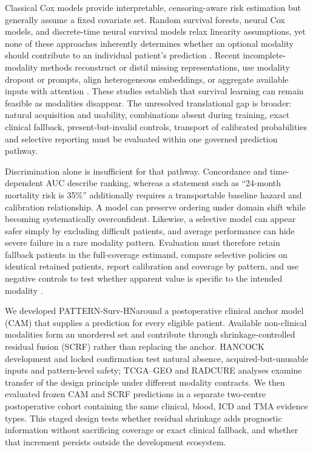 \documentclass[pdflatex,sn-nature]{sn-jnl}
\newcommand{\methodname}{PATTERN-Surv-HN}
\newcommand{\anchorname}{clinical anchor model (CAM)}
\newcommand{\fusionname}{shrinkage-controlled residual fusion (SCRF)}
\begin{document}
Classical Cox models provide interpretable, censoring-aware risk estimation but generally assume a fixed covariate set\cite{cox1972,breslow1974,harrell1996}. Random survival forests, neural Cox models, and discrete-time neural survival models relax linearity assumptions, yet none of these approaches inherently determines whether an optional modality should contribute to an individual patient's prediction \cite{ishwaran2008,katzman2018,lee2018,gensheimer2019,kvamme2019}. Recent incomplete-modality methods reconstruct or distil missing representations, use modality dropout or prompts, align heterogeneous embeddings, or aggregate available inputs with attention \cite{xu2025,zheng2026,ruffini2026}. These studies establish that survival learning can remain feasible as modalities disappear. The unresolved translational gap is broader: natural acquisition and usability, combinations absent during training, exact clinical fallback, present-but-invalid controls, transport of calibrated probabilities and selective reporting must be evaluated within one governed prediction pathway.

Discrimination alone is insufficient for that pathway. Concordance and time-dependent AUC describe ranking, whereas a statement such as ``24-month mortality risk is 35\%'' additionally requires a transportable baseline hazard and calibration relationship. A model can preserve ordering under domain shift while becoming systematically overconfident. Likewise, a selective model can appear safer simply by excluding difficult patients, and average performance can hide severe failure in a rare modality pattern. Evaluation must therefore retain fallback patients in the full-coverage estimand, compare selective policies on identical retained patients, report calibration and coverage by pattern, and use negative controls to test whether apparent value is specific to the intended modality \cite{graf1999,gerds2006,heagerty2000,uno2011,stegyerberg2010,pencina2008,vancalster2019,vickers2006,guo2017,niculescu2005,geirhos2020,ongly2024}.

We developed \methodname around a postoperative \anchorname{} that supplies a prediction for every eligible patient. Available non-clinical modalities form an unordered set and contribute through \fusionname{} rather than replacing the anchor. HANCOCK development and locked confirmation test natural absence, acquired-but-unusable inputs and pattern-level safety; TCGA--GEO and RADCURE analyses examine transfer of the design principle under different modality contracts. We then evaluated frozen CAM and SCRF predictions in a separate two-centre postoperative cohort containing the same clinical, blood, ICD and TMA evidence types. This staged design tests whether residual shrinkage adds prognostic information without sacrificing coverage or exact clinical fallback, and whether that increment persists outside the development ecosystem.
\end{document}
